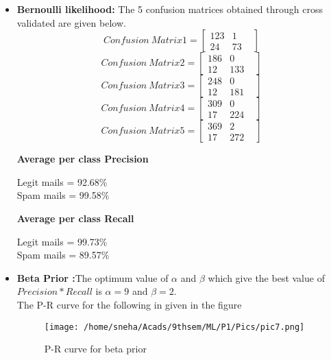 \documentclass[12pt]{article}
\begin{document}
\begin{itemize}
\item{\textbf{Bernoulli likelihood:} The 5 confusion matrices obtained through cross validated are given below.
\begin{equation}
Confusion\ Matrix1 = \begin{bmatrix}123  & 1 &\\ 24 &73 \end{bmatrix}
\end{equation}
\begin{equation}
Confusion\ Matrix2 = \begin{bmatrix}186  & 0 &\\ 12 &133 \end{bmatrix}
\end{equation}
\begin{equation}
Confusion\ Matrix3 = \begin{bmatrix}248  & 0 &\\ 12 &181 \end{bmatrix}
\end{equation}
\begin{equation}
Confusion\ Matrix4 = \begin{bmatrix}309  & 0 &\\ 17 &224 \end{bmatrix}
\end{equation}
\begin{equation}
Confusion\ Matrix5 = \begin{bmatrix}369  & 2 &\\ 17 &272 \end{bmatrix}
\end{equation}

\textbf{Average per class Precision}

Legit mails = 92.68\% \\
Spam mails  = 99.58\%   

\textbf{Average per class Recall}

Legit mails = 99.73\%\\
Spam mails  = 89.57\%

}

\item{ \textbf{Beta Prior :}The optimum value of $ \alpha $ and $ \beta $ which give the best value of $ Precision * Recall $ is $ \alpha = 9$ and $ \beta = 2 $. \\
The P-R curve for the following in given in the figure
\begin{figure}


	\centering
		\texttt{[image: /home/sneha/Acads/9thsem/ML/P1/Pics/pic7.png]}
	\caption{P-R curve for beta prior}
	
\end{figure}
}
 \end{itemize}


 
\end{document}
